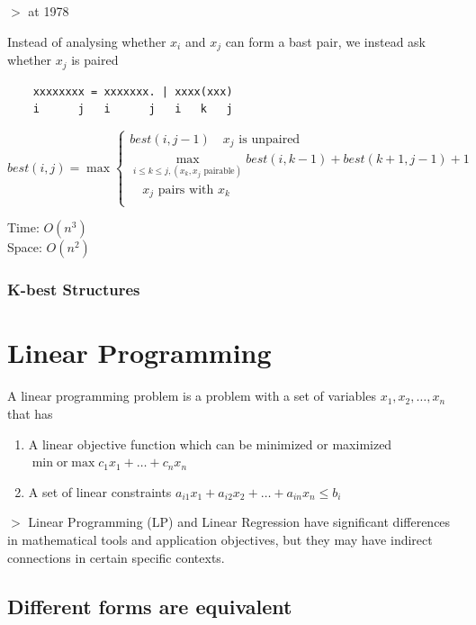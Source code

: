 \documentclass[12pt,a4paper]{article}
\newcommand{\remark}[1]{
    {\small $>$ {\color{blue} #1}}
}
\begin{document}
\remark{at 1978}

Instead of analysing whether $x_i$ and $x_j$ can form a bast pair, 
we instead ask whether $x_j$ is paired

\begin{verbatim}
    xxxxxxxx = xxxxxxx. | xxxx(xxx)
    i      j   i      j   i   k   j
\end{verbatim}

\[
best(i, j) = \max \left\{
\begin{array}{l}
    best(i, j - 1) \quad \text{$x_j$ is unpaired} \\
    \max_{i \leq k \leq j,(\text{$x_k,x_j$ pairable})} best(i, k-1) + best(k + 1, j-1) + 1 \\
    \quad \text{$x_j$ pairs with $x_k$} \\
\end{array}
\right.
\]

Time: \(O(n^3)\)\\
Space: \(O(n^2)\)

\subsubsection*{K-best Structures}


\section*{Linear Programming}

A linear programming problem is a problem with a set of variables \(x_1, x_2, \dots, x_n\) that has

\begin{enumerate}
    \item A linear objective function which can be minimized or maximized \\ 
            \(\min \text{or} \max c_1x_1+\dots+c_nx_n\)
    \item A set of linear constraints \(a_{i1}x_1 + a_{i2}x_2 + \dots + a_{in}x_n \leq b_i\) 
\end{enumerate}

\remark{Linear Programming (LP) and Linear Regression have significant differences in mathematical tools and application objectives, but they may have indirect connections in certain specific contexts.}

\subsection*{Different forms are equivalent}
\end{document}
